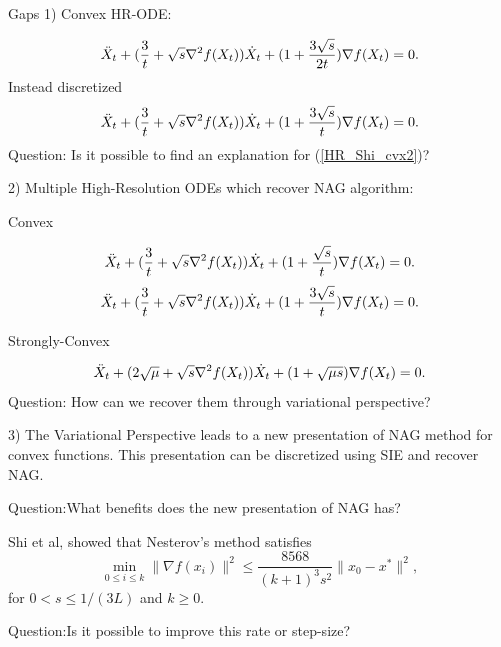 \documentclass{beamer}
\begin{document}
\begin{frame}[t,allowframebreaks]{Gaps}
    1) Convex HR-ODE:

\begin{align}\label{HR_Shi_cvx}
     \Ddot{X}_t + (\frac{3}{t}+\sqrt{s}\nabla^2 f(X_t))\dot{X}_t+(1+\frac{3\sqrt{s}}{2t})\nabla f(X_t)=0.
\end{align}
Instead \cite{shi2019acceleration} discretized
\begin{align}\label{HR_Shi_cvx2}
     \Ddot{X}_t + (\frac{3}{t}+\sqrt{s}\nabla^2 f(X_t))\dot{X}_t+(1+\frac{3\sqrt{s}}{t})\nabla f(X_t)=0.
\end{align}
\alert{Question:} Is it possible to find an explanation for (\ref{HR_Shi_cvx2})?


\framebreak


2) Multiple High-Resolution ODEs which recover NAG algorithm:
\footnotesize
\cite{pmlr-v108-laborde20a,wilson2021lyapunov,shi2019acceleration}
\begin{center}
    Convex
\end{center}
\begin{align}
    \Ddot{X}_t + (\frac{3}{t}+\sqrt{s}\nabla^2 f(X_t))\dot{X}_t+(1+\frac{\sqrt{s}}{t})\nabla f(X_t)=0.
\end{align}
\begin{align}
    \Ddot{X}_t + (\frac{3}{t}+\sqrt{s}\nabla^2 f(X_t))\dot{X}_t+(1+\frac{3\sqrt{s}}{t})\nabla f(X_t)=0.
\end{align}
\begin{center}
    Strongly-Convex
\end{center}
\begin{align}
    \Ddot{X}_t + (2\sqrt{\mu}+\sqrt{s}\nabla^2 f(X_t))\dot{X}_t+(1+\sqrt{\mu s})\nabla f(X_t)=0.
\end{align}
\normalsize
\alert{Question:} How can we recover them through variational perspective?


\framebreak


3) The Variational Perspective leads to a new presentation of NAG method for convex functions. This presentation can be discretized using SIE and recover NAG.  

\alert{ Question:}What benefits does the new presentation of NAG has?

Shi et al, showed that Nesterov's method satisfies
$$ \min_{0\leq i\leq k}\|\nabla f(x_i)\|^2 \leq \frac{8568}{(k+1)^3s^2}\|x_0-x^*\|^2,$$
for $0< s\leq 1/(3L)$ and $k\geq0$.

\alert{Question:}Is it possible to improve this rate or step-size?



\end{frame}
\end{document}
